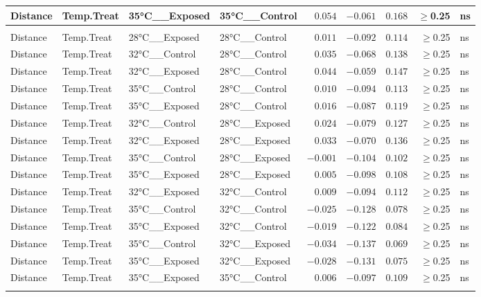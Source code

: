 \documentclass[
]{article}
\begin{document}
\begin{longtable}{llllrrrrl}
Distance & Temp.Treat & 35°C\_\_Exposed & 35°C\_\_Control & $0.054$ & $-0.061$ & $0.168$ & $\geq$0.25 & ns \\ 
\midrule\addlinespace[2.5pt]
\multicolumn{9}{l}{canberra} \\ 
\midrule\addlinespace[2.5pt]
Distance & Temp.Treat & 28°C\_\_Exposed & 28°C\_\_Control & $0.011$ & $-0.092$ & $0.114$ & $\geq$0.25 & ns \\ 
Distance & Temp.Treat & 32°C\_\_Control & 28°C\_\_Control & $0.035$ & $-0.068$ & $0.138$ & $\geq$0.25 & ns \\ 
Distance & Temp.Treat & 32°C\_\_Exposed & 28°C\_\_Control & $0.044$ & $-0.059$ & $0.147$ & $\geq$0.25 & ns \\ 
Distance & Temp.Treat & 35°C\_\_Control & 28°C\_\_Control & $0.010$ & $-0.094$ & $0.113$ & $\geq$0.25 & ns \\ 
Distance & Temp.Treat & 35°C\_\_Exposed & 28°C\_\_Control & $0.016$ & $-0.087$ & $0.119$ & $\geq$0.25 & ns \\ 
Distance & Temp.Treat & 32°C\_\_Control & 28°C\_\_Exposed & $0.024$ & $-0.079$ & $0.127$ & $\geq$0.25 & ns \\ 
Distance & Temp.Treat & 32°C\_\_Exposed & 28°C\_\_Exposed & $0.033$ & $-0.070$ & $0.136$ & $\geq$0.25 & ns \\ 
Distance & Temp.Treat & 35°C\_\_Control & 28°C\_\_Exposed & $-0.001$ & $-0.104$ & $0.102$ & $\geq$0.25 & ns \\ 
Distance & Temp.Treat & 35°C\_\_Exposed & 28°C\_\_Exposed & $0.005$ & $-0.098$ & $0.108$ & $\geq$0.25 & ns \\ 
Distance & Temp.Treat & 32°C\_\_Exposed & 32°C\_\_Control & $0.009$ & $-0.094$ & $0.112$ & $\geq$0.25 & ns \\ 
Distance & Temp.Treat & 35°C\_\_Control & 32°C\_\_Control & $-0.025$ & $-0.128$ & $0.078$ & $\geq$0.25 & ns \\ 
Distance & Temp.Treat & 35°C\_\_Exposed & 32°C\_\_Control & $-0.019$ & $-0.122$ & $0.084$ & $\geq$0.25 & ns \\ 
Distance & Temp.Treat & 35°C\_\_Control & 32°C\_\_Exposed & $-0.034$ & $-0.137$ & $0.069$ & $\geq$0.25 & ns \\ 
Distance & Temp.Treat & 35°C\_\_Exposed & 32°C\_\_Exposed & $-0.028$ & $-0.131$ & $0.075$ & $\geq$0.25 & ns \\ 
Distance & Temp.Treat & 35°C\_\_Exposed & 35°C\_\_Control & $0.006$ & $-0.097$ & $0.109$ & $\geq$0.25 & ns \\ 
\midrule\addlinespace[2.5pt]
\multicolumn{9}{l}{gunifrac} \\ 

\end{longtable}
\end{document}
